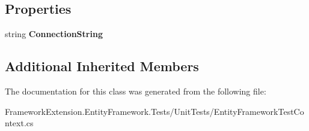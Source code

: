 \subsection*{Properties}
\begin{DoxyCompactItemize}
\item 
\hypertarget{class_framework_extension_1_1_entity_framework_1_1_tests_1_1_unit_tests_1_1_entity_framework_test_context_ab3b39185c67bbc2664808e6605180c31}{string {\bfseries Connection\-String}}\label{class_framework_extension_1_1_entity_framework_1_1_tests_1_1_unit_tests_1_1_entity_framework_test_context_ab3b39185c67bbc2664808e6605180c31}

\end{DoxyCompactItemize}
\subsection*{Additional Inherited Members}


The documentation for this class was generated from the following file\-:\begin{DoxyCompactItemize}
\item 
Framework\-Extension.\-Entity\-Framework.\-Tests/\-Unit\-Tests/Entity\-Framework\-Test\-Context.\-cs\end{DoxyCompactItemize}

